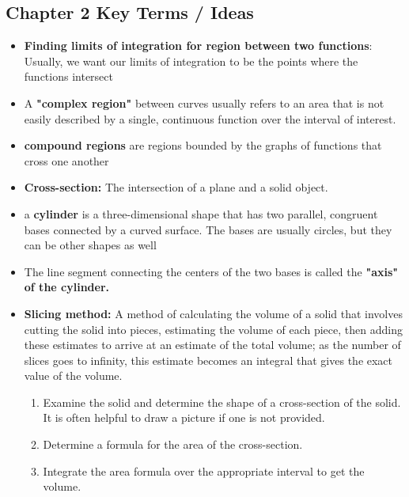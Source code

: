 \documentclass{report}
\begin{document}
    \subsection{Chapter 2 Key Terms / Ideas}
    \bigbreak \noindent 
    \begin{itemize}
        \item \textbf{Finding limits of integration for region between two functions}: Usually, we want our limits of integration to be the points where the functions intersect
        \item A \textbf{"complex region"} between curves usually refers to an area that is not easily described by a single, continuous function over the interval of interest.
        \item \textbf{compound regions} are regions bounded by the graphs of functions that cross one another
        \item \textbf{Cross-section:} The intersection of a plane and a solid object.
        \item a \textbf{cylinder} is a three-dimensional shape that has two parallel, congruent bases connected by a curved surface. The bases are usually circles, but they can be other shapes as well
        \item The line segment connecting the centers of the two bases is called the \textbf{"axis" of the cylinder.}
        \item \textbf{Slicing method:} A method of calculating the volume of a solid that involves cutting the solid into pieces, estimating the volume of each piece, then adding these estimates to arrive at an estimate of the total volume; as the number of slices goes to infinity, this estimate becomes an integral that gives the exact value of the volume.
        \begin{enumerate}
            \item Examine the solid and determine the shape of a cross-section of the solid. It is often helpful to draw a picture if one is not provided.
            \item Determine a formula for the area of the cross-section.
            \item Integrate the area formula over the appropriate interval to get the volume.
        \end{enumerate}

\end{itemize}
\end{document}
